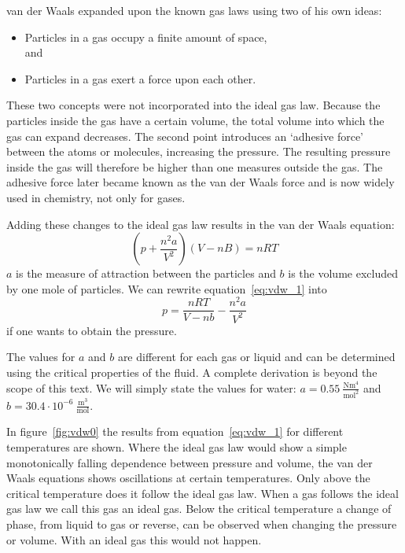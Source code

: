 \documentclass[12pt,a4paper]{article}
\numberwithin{equation}{section}
\numberwithin{figure}{section}
\numberwithin{table}{section}
\begin{document}
van der Waals expanded upon the known gas laws using two of his own ideas:
\begin{itemize}
\item Particles in a gas occupy a finite amount of space,\\
and
\item Particles in a gas exert a force upon each other.
\end{itemize}
These two concepts were not incorporated into the ideal gas law. Because the particles inside the gas have a certain volume, the total volume into which the gas can expand decreases. The second point introduces an `adhesive force' between the atoms or molecules, increasing the pressure. The resulting pressure inside the gas will therefore be higher than one measures outside the gas. The adhesive force later became known as the van der Waals force and is now widely used in chemistry, not only for gases.

Adding these changes to the ideal gas law results in the van der Waals equation:
\begin{equation}
\left( p+ \frac{n^{2} a}{V^2} \right) \left( V -nB \right)  = nRT \label{eq:vdw_1}
\end{equation}
$a$ is the measure of attraction between the particles and $b$ is the volume excluded by one mole of particles. We can rewrite equation~\ref{eq:vdw_1} into
\begin{equation}
p=\frac{nRT}{V-nb}-\frac{n^{2}a}{V^2}
\end{equation}
if one wants to obtain the pressure.

The values for $a$ and $b$ are different for each gas or liquid and can be determined using the critical properties of the fluid. A complete derivation is beyond the scope of this text. We will simply state the values for water: $a=0.55~\frac{\mbox{Nm}^4}{\mbox{mol}^2}$ and $b=30.4 \cdot 10^{-6}~\frac{\mbox{m}^3}{\mbox{mol}}$.

In figure~\ref{fig:vdw0} the results from equation~\ref{eq:vdw_1} for different temperatures are shown. Where the ideal gas law would show a simple monotonically falling dependence between pressure and volume, the van der Waals equations shows oscillations at certain temperatures. Only above the critical temperature does it follow the ideal gas law. When a gas follows the ideal gas law we call this gas an ideal gas. Below the critical temperature a change of phase, from liquid to gas or reverse, can be observed when changing the pressure or volume. With an ideal gas this would not happen.
\end{document}

